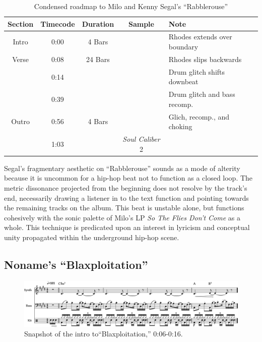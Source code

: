 \begin{table}[ht]
    \centering
        \begin{tabular}{|c|c|c|c|l|}
             \hline
            Section & Timecode & Duration & Sample                  & Note \\ \hline
            Intro   & 0:00     & 4 Bars   &                         & Rhodes extends over boundary \\ \hline
            Verse   & 0:08     & 24 Bars  &                         & Rhodes slips backwards \\ \hline
                    & 0:14     &          &                         & Drum glitch shifts downbeat \\ \hline
                    & 0:39     &          &                         & Drum glitch and bass recomp. \\ \hline
            Outro   & 0:56     & 4 Bars   &                         & Glich, recomp., and choking \\ \hline
                    & 1:03     &          & \textit{Soul Caliber} 2 & \\ \hline
        \end{tabular}
    \caption{Condensed roadmap to Milo and Kenny Segal's ``Rabblerouse''}
    \label{tab:rabblerouse}
\end{table}

\normalsize Segal's fragmentary aesthetic on ``Rabblerouse'' sounds as a mode of alterity because it is uncommon for a hip-hop beat not to function as a closed loop. The metric dissonance projected from the beginning does not resolve by the track's end, necessarily drawing a listener in to the text function and pointing towards the remaining tracks on the album. This beat is unstable alone, but functions cohesively with the sonic palette of Milo's LP \textit{So The Flies Don't Come} as a whole. This technique is predicated upon an interest in lyricism and conceptual unity propagated within the underground hip-hop scene.

\subsection*{\centering Noname's ``Blaxploitation''}

\begin{figure}[ht]
    \centering
    \includegraphics[width=\textwidth]{images/figures/chp 02/006016blaxintro.pdf}
    \caption{Snapshot of the intro to``Blaxploitation,'' 0:06-0:16.}
    \label{fig:blaxploitationintro}
\end{figure}

